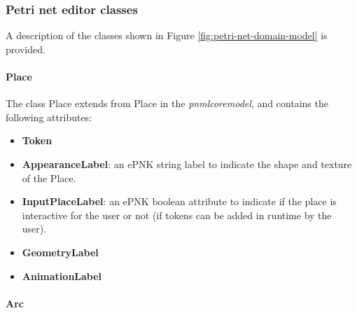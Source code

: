 \subsubsection{Petri net editor classes}

A description of the classes shown in Figure \ref{fig:petri-net-domain-model} is provided.

\paragraph{Place}

The class Place extends from Place in the \textit{pnmlcoremodel}, and contains the following attributes:

\begin{itemize}
	\item \textbf{Token}
	\item \textbf{AppearanceLabel}: an ePNK string label to indicate the shape and texture of the Place.
	\item \textbf{InputPlaceLabel}: an ePNK boolean attribute to indicate if the place is interactive for the user or not (if tokens can be added in runtime by the user).
	\item \textbf{GeometryLabel}
	\item \textbf{AnimationLabel}
\end{itemize}

\paragraph{Arc}
